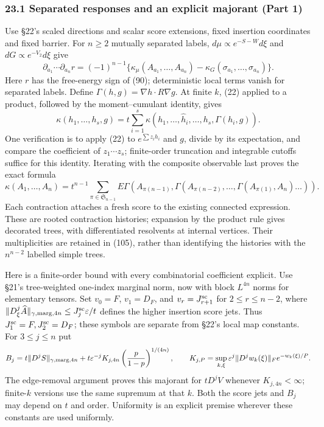 \documentclass[11pt,a4paper]{article}
\begin{document}
\hypertarget{separated-responses-and-an-explicit-majorant-part-1}{%
\subsubsection{23.1 Separated responses and an explicit majorant (Part
1)}\label{separated-responses-and-an-explicit-majorant-part-1}}

Use §22's scaled directions and scalar score extensions, fixed insertion
coordinates and fixed barrier. For \(n\ge2\) mutually separated labels,
\(d\mu\propto e^{-S-W}d\xi\) and \(dG\propto e^{-V_2}d\xi\) give
\[\partial_{a_1}\cdots\partial_{a_n}r
=(-1)^{n-1}\{\kappa_\mu(A_{a_1},\ldots,A_{a_n})
-\kappa_G(\sigma_{a_1},\ldots,\sigma_{a_n})\}.\tag{103}\] Here \(r\) has
the free-energy sign of (90); deterministic local terms vanish for
separated labels. Define \(\Gamma(h,g)=\nabla h\cdot R\nabla g\). At
finite \(k\), (22) applied to a product, followed by the
moment--cumulant identity, gives
\[\kappa(h_1,\ldots,h_s,g)=t\sum_{i=1}^s
\kappa(h_1,\ldots,\widehat h_i,\ldots,h_s,\Gamma(h_i,g)).\] One
verification is to apply (22) to \(e^{\sum z_i h_i}\) and \(g\), divide
by its expectation, and compare the coefficient of \(z_1\cdots z_s\);
finite-order truncation and integrable cutoffs suffice for this
identity. Iterating with the composite observable last proves the exact
formula \[\kappa(A_1,\ldots,A_n)=t^{n-1}\sum_{\pi\in\mathfrak S_{n-1}}
E\Gamma(A_{\pi(n-1)},\Gamma(A_{\pi(n-2)},\ldots,
\Gamma(A_{\pi(1)},A_n)\ldots)).\tag{104}\] Each contraction attaches a
fresh score to the existing connected expression. These are rooted
contraction histories; expansion by the product rule gives decorated
trees, with differentiated resolvents at internal vertices. Their
multiplicities are retained in (105), rather than identifying the
histories with the \(n^{n-2}\) labelled simple trees.

Here is a finite-order bound with every combinatorial coefficient
explicit. Use §21's tree-weighted one-index marginal norm, now with
block \(L^{4n}\) norms for elementary tensors. Set \(v_0=F\),
\(v_1=D_F\), and \(v_r=J^{\rm sc}_{r+1}\) for \(2\le r\le n-2\), where
\(\|D_\xi^j\widehat A\|_{\gamma,\mathrm{marg},4n} \le J^{\rm sc}_j\varepsilon/t\)
defines the higher insertion score jets. Thus
\(J^{\rm sc}_1=F,J^{\rm sc}_2=D_F\); these symbols are separate from
§22's local map constants. For \(3\le j\le n\) put
\[B_j=t\|D^jS\|_{\gamma,\mathrm{marg},4n}
 +t\varepsilon^{-j}K_{j,4n}\left({p\over1-p}\right)^{1/(4n)},\qquad
K_{j,P}=\sup_{k,\xi}\varepsilon^j\|D^jw_k(\xi)\|_F e^{-w_k(\xi)/P}.\]
The edge-removal argument proves this majorant for \(tD^jV\) whenever
\(K_{j,4n}<\infty\); finite-\(k\) versions use the same supremum at that
\(k\). Both the score jets and \(B_j\) may depend on \(t\) and order.
Uniformity is an explicit premise wherever these constants are used
uniformly.
\end{document}

